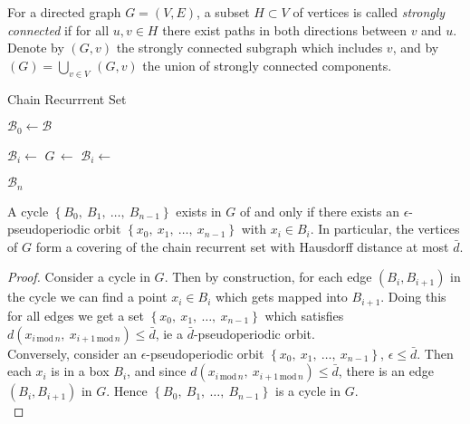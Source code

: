 \begin{definition}
    For a directed graph $G = (V, E)$, a subset $H \subset V$ of vertices is called 
    \emph{strongly connected} if for all $u, v \in H$ there exist paths in both 
    directions between $v$ and $u$. Denote by $(G, v)$ the strongly connected
    subgraph which includes $v$, and by 
    $(G) = \bigcup_{v \in V}\,$$(G, v)$ 
    the union of strongly connected components.
\end{definition}

\begin{algorithm}
    \caption{Chain Recurrrent Set}
    \label{alg:chain}

    \begin{algorithmic}[1]
        \State $\mathcal{B}_0 \gets \mathcal{B}$

            \State $\mathcal{B}_i \gets$ 
            \State $G\, \gets$ 
            \State $\mathcal{B}_i \gets$ 
        \EndFor

        \State \Return $\mathcal{B}_n$
    \end{algorithmic}
\end{algorithm}

\begin{proposition}
    A cycle $\left\{ B_0,\ B_1,\ \ldots,\ B_{n-1} \right\}$ exists in $G$
    of and only if there exists an $\epsilon$-pseudoperiodic orbit 
    $\left\{ x_0,\ x_1,\ \ldots,\ x_{n-1} \right\}$ with $x_i \in B_i$.
    In particular, the vertices of $G$ form a covering of the chain recurrent set with 
    Hausdorff distance at most $\bar{d}$.
\end{proposition}

\begin{proof}
    Consider a cycle in $G$. Then by construction, for each edge $(B_i, B_{i+1})$ in the 
    cycle we can find a point $x_i \in B_i$ which gets mapped into $B_{i+1}$. Doing this for all
    edges we get a set $\left\{ x_0,\ x_1,\ \ldots,\ x_{n-1} \right\}$ which satisfies 
    $d(x_{i\, \text{mod}\, n},\ x_{i+1\, \text{mod}\, n}) \leq \bar{d}$, ie a 
    $\bar{d}$-pseudoperiodic orbit. \\

    Conversely, consider an $\epsilon$-pseudoperiodic orbit 
    $\left\{ x_0,\ x_1,\ \ldots,\ x_{n-1} \right\}$, $\epsilon \leq \bar{d}$. Then each $x_i$ is in
    a box $B_i$, and since $d(x_{i\, \text{mod}\, n},\ x_{i+1\, \text{mod}\, n}) \leq \bar{d}$, 
    there is an edge $(B_i, B_{i+1})$ in $G$. Hence 
    $\left\{ B_0,\ B_1,\ \ldots,\ B_{n-1} \right\}$ is a cycle in $G$. \\
\end{proof}

